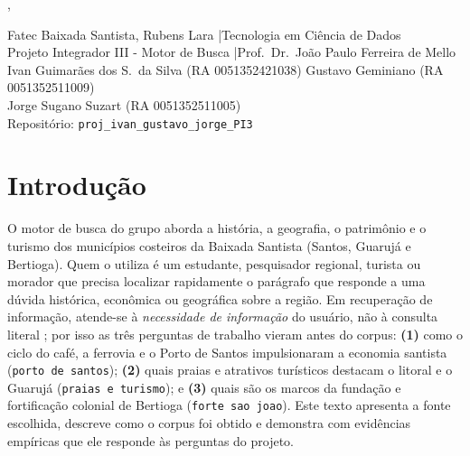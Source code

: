 \documentclass[
  article,
  12pt,
  oneside,
  a4paper,
  english,
  brazil
]{abntex2}\usepackage[]{graphicx}\usepackage[]{xcolor}
\newcommand{\nomecurso}{Tecnologia em Ciência de Dados}
\newcommand{\nomedisciplina}{Projeto Integrador III - Motor de Busca}
\newcommand{\nomeprofessor}{Prof.\ Dr.\ João Paulo Ferreira de Mello}
\newcommand{\repositorio}{proj\_ivan\_gustavo\_jorge\_PI3}
\newcommand{\integrantes}{%
  Ivan Guimarães dos S.\ da Silva (RA 0051352421038) \quad
  Gustavo Geminiano (RA 0051352511009) \\
  Jorge Sugano Suzart (RA 0051352511005)%
}
\begin{document}
\frenchspacing
\captiondelim{ - }

\begin{center}
  \SingleSpacing
  {\Large \imprimirtitulo \par}
  \vspace{0.5em}
  {\large \imprimirautor \par}
  \vspace{0.2em}
  \imprimirlocal, \imprimirdata
\end{center}

\begin{center}
  \small
  \SingleSpacing
  Fatec Baixada Santista, Rubens Lara \quad|\quad \nomecurso{} \\
  \nomedisciplina{} \quad|\quad \nomeprofessor{} \\[0.25em]
  {\footnotesize \integrantes} \\[0.25em]
  Repositório: \texttt{\repositorio}
\end{center}

\textual

\section{Introdução}

O motor de busca do grupo aborda a história, a geografia, o patrimônio e o
turismo dos municípios costeiros da Baixada Santista (Santos, Guarujá e
Bertioga). Quem o utiliza é um estudante, pesquisador regional, turista ou
morador que precisa localizar rapidamente o parágrafo que responde a uma
dúvida histórica, econômica ou geográfica sobre a região. Em recuperação de
informação, atende-se à \emph{necessidade de informação} do usuário, não à
consulta literal \cite[cap.~1]{manning2008}; por isso as três perguntas de
trabalho vieram antes do corpus: \textbf{(1)} como o ciclo do café, a ferrovia
e o Porto de Santos impulsionaram a economia santista (\texttt{porto de santos});
\textbf{(2)} quais praias e atrativos turísticos destacam o litoral e o
Guarujá (\texttt{praias e turismo}); e \textbf{(3)} quais são os marcos da
fundação e fortificação colonial de Bertioga (\texttt{forte sao joao}). Este
texto apresenta a fonte escolhida, descreve como o corpus foi obtido e
demonstra com evidências empíricas que ele responde às perguntas do projeto.

\end{document}
